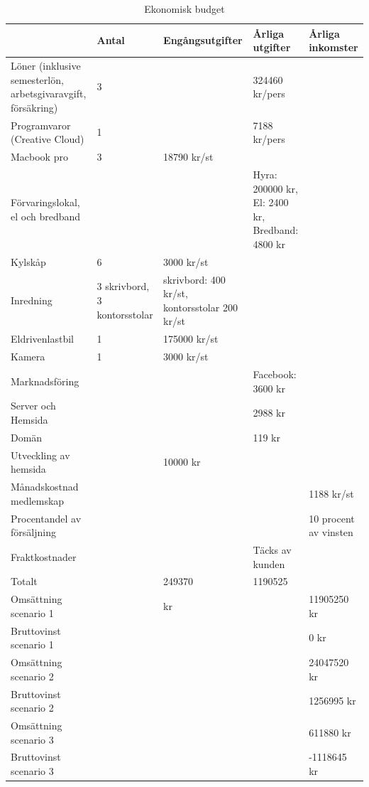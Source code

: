 \documentclass[10pt,a4paper,oneside]{article}
\begin{document}
\begin{table}[tb]
\centering
\begin{tabular}{ | p{3cm} | p{2cm} | p{2cm} | p{2cm} | p{2cm} |}
 \hline
  & Antal & Eng\r{a}ngsutgifter & \r{A}rliga utgifter & \r{A}rliga inkomster\\ \hline
L\"oner (inklusive semesterl\"on, arbetsgivaravgift, f\"ors\"akring) & 3 &  & 324460 kr/pers &  \\ \hline
Programvaror (Creative Cloud) &1 &  & 7188 kr/pers &  \\ \hline
Macbook pro  & 3 & 18790 kr/st &  &  \\ \hline
F\"orvaringslokal, el och bredband &  &  & Hyra: 200000 kr, El: 2400 kr, Bredband: 4800 kr & \\ \hline
Kylsk\r{a}p  & 6 & 3000 kr/st &  & \\ \hline
Inredning & 3 skrivbord, 3 kontorsstolar & skrivbord: 400 kr/st, kontorsstolar 200 kr/st &  & \\ \hline
Eldrivenlastbil & 1 & 175000 kr/st &  & \\ \hline
Kamera & 1 & 3000 kr/st &  & \\ \hline
Marknadsf\"oring &  &  & Facebook: 3600 kr & \\ \hline
Server och Hemsida &  &  & 2988 kr & \\ \hline
Dom\"an &  &  & 119 kr & \\ \hline
Utveckling av hemsida &  & 10000 kr &  & \\ \hline
M\r{a}nadskostnad medlemskap  &  &  &  & 1188 kr/st\\ \hline
Procentandel av f\"ors\"aljning  &  &  &  & 10 procent av vinsten\\ \hline
Fraktkostnader &  &  & T\"acks av kunden & \\ \hline
Totalt &  & 249370 & 1190525 & \\ \hline
Oms\"attning
scenario 1 &  &  kr &  & 11905250 kr\\ \hline
Bruttovinst scenario 1 &  &  &  & 0 kr\\ \hline
Oms\"attning scenario 2 &  &  &  & 24047520 kr\\ \hline
Bruttovinst
scenario 2 &  &  &  & 1256995 kr\\ \hline
Oms\"attning scenario 3 &  &  &  & 611880 kr\\ \hline
Bruttovinst scenario 3 &  &  &  & -1118645 kr\\ \hline

\end{tabular}
\caption{\label{tab:one} Ekonomisk budget}
\end{table}
\end{document}
